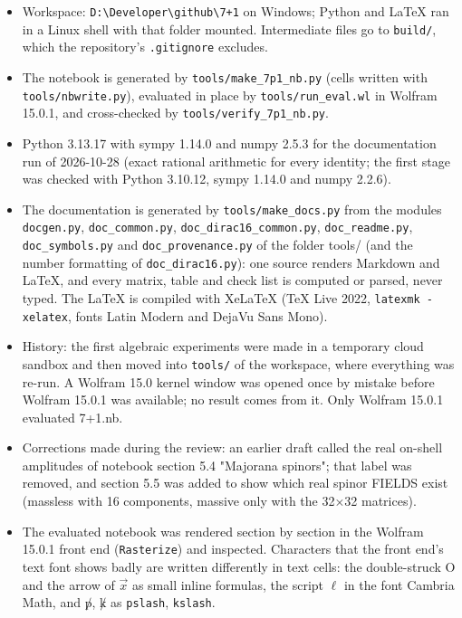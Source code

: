 \documentclass[10pt,a4paper]{article}
\begin{document}
\begin{itemize}
\item Workspace: \texttt{D:\textbackslash{}\allowbreak{}Developer\textbackslash{}\allowbreak{}github\textbackslash{}\allowbreak{}7+1} on Windows; Python and LaTeX ran in a Linux shell with that folder mounted. Intermediate files go to \texttt{build/\allowbreak{}}, which the repository's \texttt{.gitignore} excludes.
\item The notebook is generated by \texttt{tools/\allowbreak{}make\_\allowbreak{}7p1\_\allowbreak{}nb.py} (cells written with \texttt{tools/\allowbreak{}nbwrite.py}), evaluated in place by \texttt{tools/\allowbreak{}run\_\allowbreak{}eval.wl} in Wolfram 15.0.1, and cross-checked by \texttt{tools/\allowbreak{}verify\_\allowbreak{}7p1\_\allowbreak{}nb.py}.
\item Python 3.13.17 with sympy 1.14.0 and numpy 2.5.3 for the documentation run of 2026-10-28 (exact rational arithmetic for every identity; the first stage was checked with Python 3.10.12, sympy 1.14.0 and numpy 2.2.6).
\item The documentation is generated by \texttt{tools/\allowbreak{}make\_\allowbreak{}docs.py} from the modules \texttt{docgen.py}, \texttt{doc\_\allowbreak{}common.py}, \texttt{doc\_\allowbreak{}dirac16\_\allowbreak{}common.py}, \texttt{doc\_\allowbreak{}readme.py}, \texttt{doc\_\allowbreak{}symbols.py} and \texttt{doc\_\allowbreak{}provenance.py} of the folder tools/ (and the number formatting of \texttt{doc\_\allowbreak{}dirac16.py}): one source renders Markdown and LaTeX, and every matrix, table and check list is computed or parsed, never typed. The LaTeX is compiled with XeLaTeX (TeX Live 2022, \texttt{latexmk -xelatex}, fonts Latin Modern and DejaVu Sans Mono).
\item History: the first algebraic experiments were made in a temporary cloud sandbox and then moved into \texttt{tools/\allowbreak{}} of the workspace, where everything was re-run. A Wolfram 15.0 kernel window was opened once by mistake before Wolfram 15.0.1 was available; no result comes from it. Only Wolfram 15.0.1 evaluated 7+1.nb.
\item Corrections made during the review: an earlier draft called the real on-shell amplitudes of notebook section 5.4 "Majorana spinors"; that label was removed, and section 5.5 was added to show which real spinor FIELDS exist (massless with 16 components, massive only with the 32×32 matrices).
\item The evaluated notebook was rendered section by section in the Wolfram 15.0.1 front end (\texttt{Rasterize}) and inspected. Characters that the front end's text font shows badly are written differently in text cells: the double-struck O and the arrow of $\vec x$ as small inline formulas, the script $\ell$ in the font Cambria Math, and $\not p$, $\not k$ as \texttt{pslash}, \texttt{kslash}.

\end{itemize}
\end{document}
